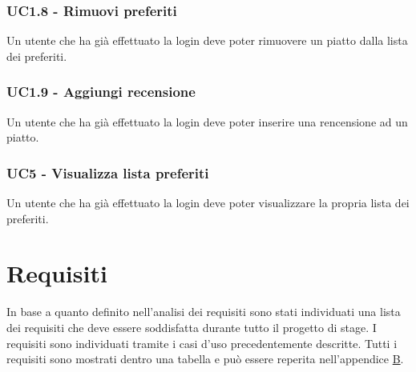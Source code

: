\subsubsection{UC1.8 - Rimuovi preferiti}
Un utente che ha già effettuato la login deve poter rimuovere un piatto dalla lista dei preferiti.
\subsubsection{UC1.9 - Aggiungi recensione}
Un utente che ha già effettuato la login deve poter inserire una rencensione ad un piatto.
\subsubsection{UC5 - Visualizza lista preferiti}
Un utente che ha già effettuato la login deve poter visualizzare la propria lista dei preferiti.
\section{Requisiti}
In base a quanto definito nell'analisi dei requisiti sono stati individuati una lista dei requisiti che deve essere soddisfatta durante tutto il progetto di stage. I requisiti sono individuati tramite i casi d'uso precedentemente descritte. Tutti i requisiti sono mostrati dentro una tabella e può essere reperita nell'appendice {\hyperref[cap:appendice b]{B}}.